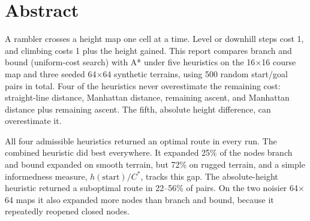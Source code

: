 \chapter*{\Large \center Abstract}

A rambler crosses a height map one cell at a time. Level or downhill steps cost 1, and climbing costs 1 plus the height gained. This report compares branch and bound (uniform-cost search) with A* under five heuristics on the 16$\times$16 course map and three seeded 64$\times$64 synthetic terrains, using 500 random start/goal pairs in total. Four of the heuristics never overestimate the remaining cost: straight-line distance, Manhattan distance, remaining ascent, and Manhattan distance plus remaining ascent. The fifth, absolute height difference, can overestimate it.

All four admissible heuristics returned an optimal route in every run. The combined heuristic did best everywhere. It expanded 25\% of the nodes branch and bound expanded on smooth terrain, but 72\% on rugged terrain, and a simple informedness measure, $h(\text{start})/C^*$, tracks this gap. The absolute-height heuristic returned a suboptimal route in 22--56\% of pairs. On the two noisier 64$\times$64 maps it also expanded more nodes than branch and bound, because it repeatedly reopened closed nodes.
